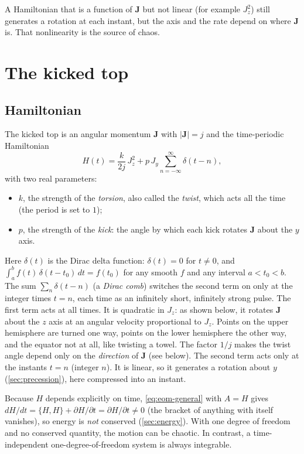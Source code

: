 \documentclass[11pt,a4paper]{article}
\newcommand{\vJ}{\bm{J}}
\newcommand{\PB}[2]{\{#1,#2\}}
\begin{document}
A Hamiltonian that is a function of $\vJ$ but not linear (for example $J_z^2$) still generates a rotation at each
instant, but the axis and the rate depend on where $\vJ$ is. That nonlinearity is the source of chaos.

\section{The kicked top}\label{sec:model}

\subsection{Hamiltonian}

The kicked top is an angular momentum $\vJ$ with $|\vJ| = j$ and the time-periodic Hamiltonian
\begin{equation}\label{eq:H}
  \boxed{H(t) = \frac{k}{2j}\, J_z^2 + p\, J_y \sum_{n=-\infty}^{\infty} \delta(t-n) ,}
\end{equation}
with two real parameters:
\begin{itemize}
  \item $k$, the strength of the \emph{torsion}, also called the \emph{twist}, which acts all the time (the period
  is set to $1$);
  \item $p$, the strength of the \emph{kick}: the angle by which each kick rotates $\vJ$ about the $y$ axis.
\end{itemize}
Here $\delta(t)$ is the Dirac delta function: $\delta(t) = 0$ for $t\ne0$, and $\int_a^b f(t)\,\delta(t-t_0)\,dt =
f(t_0)$ for any smooth $f$ and any interval $a < t_0 < b$. The sum $\sum_n\delta(t-n)$ (a \emph{Dirac comb}) switches
the second term on only at the integer times $t = n$, each time as an infinitely short, infinitely strong pulse.
The first term acts at all times. It is quadratic in $J_z$: as shown below, it rotates $\vJ$ about the $z$ axis at
an angular velocity proportional to $J_z$. Points on the upper hemisphere are turned one way, points on the lower
hemisphere the other way, and the equator not at all, like twisting a towel. The factor $1/j$ makes the twist angle depend only on the
\emph{direction} of $\vJ$ (see below). The second term acts only at the instants $t = n$ (integer $n$). It is
linear, so it generates a rotation about $y$ (\cref{sec:precession}), here compressed into an instant.

Because $H$ depends explicitly on time, \eqref{eq:eom-general} with $A = H$ gives $dH/dt = \PB{H}{H} + \partial
H/\partial t = \partial H/\partial t \ne 0$ (the bracket of anything with itself vanishes), so energy is \emph{not} conserved
(\cref{sec:energy}). With one degree of freedom and no conserved quantity, the motion can be chaotic. In contrast, a
time-independent one-degree-of-freedom system is always integrable.
\end{document}
